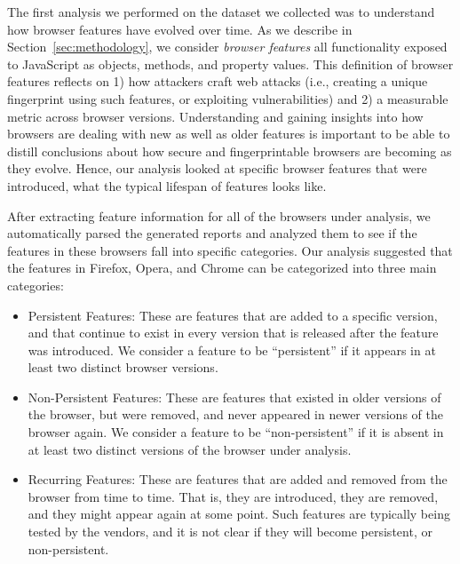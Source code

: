 The first analysis we performed on the dataset we collected was to
understand how browser features have evolved over time. As we describe
in Section~\ref{sec:methodology}, we consider \textit{browser features}
all functionality exposed to JavaScript as objects, methods, and property values.
This definition of browser features reflects on 1) how attackers craft web attacks
(i.e., creating a unique fingerprint using such features, or exploiting  vulnerabilities) and 2)
a measurable metric across browser versions. Understanding
and gaining insights into how browsers are dealing with new
as well as older features is important to be able to distill
conclusions about how secure and fingerprintable browsers are becoming
as they evolve. Hence, our analysis looked at specific browser
features that were introduced, what the typical lifespan of features
looks like.

After extracting feature information for all of the browsers under
analysis, we automatically parsed the generated reports and analyzed
them to see if the features in these browsers fall into specific
categories. Our analysis suggested that the features in Firefox, Opera, and
Chrome can be categorized into three main categories:

\begin{itemize}
  
\item Persistent Features: These are features that are added to a
  specific version, and that continue to exist in every version that
  is released after the feature was introduced. We consider a feature
  to be ``persistent'' if it appears in at least two distinct browser
  versions.
      
\item Non-Persistent Features: These are features that existed in
  older versions of the browser, but were removed, and never appeared
  in newer versions of the browser again. We consider a feature to be
  ``non-persistent'' if it is absent in at least two distinct versions
  of the browser under analysis.
      
\item Recurring Features: These are features that are added and
  removed from the browser from time to time. That is, they are
  introduced, they are removed, and they might appear again at some
  point. Such features are typically being tested by the vendors, and
  it is not clear if they will become persistent, or non-persistent.

\end{itemize}

